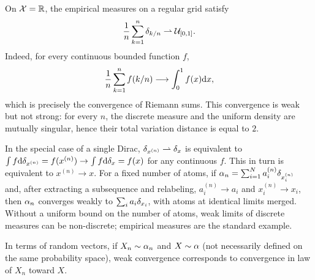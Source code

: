 \begin{rem}\label{rem-riemann-weak-limit}
	On $\mathcal{X}=\mathbb{R}$, the empirical measures on a regular grid satisfy
	\[
		\frac{1}{n} \sum_{k=1}^n \delta_{k/n} \rightharpoonup \mathcal{U}_{[0,1]}.
	\]
	Indeed, for every continuous bounded function $f$,
	\[
		\frac{1}{n} \sum_{k=1}^n f(k/n) \longrightarrow \int_0^1 f(x) \mathrm{d} x,
	\]
	which is precisely the convergence of Riemann sums. This convergence is weak but not strong: for every $n$, the discrete measure and the uniform density are mutually singular, hence their total variation distance is equal to $2$.
\end{rem}

\begin{rem}\label{rem-weak-conv-disc}
	In the special case of a single Dirac, $\delta_{x^{(n)}} \rightharpoonup \delta_x$ is equivalent to $\int f \mathrm{d}\delta_{x^{(n)}} = f(x^{(n)}) \rightarrow \int f \mathrm{d}\delta_{x} = f(x)$ for any continuous $f$. This in turn is equivalent to $x^{(n)} \rightarrow x$.
	For a fixed number of atoms, if $\alpha_n=\sum_{i=1}^N a_i^{(n)}\delta_{x_i^{(n)}}$ and, after extracting a subsequence and relabeling, $a_i^{(n)}\to a_i$ and $x_i^{(n)}\to x_i$, then $\alpha_n$ converges weakly to $\sum_i a_i\delta_{x_i}$, with atoms at identical limits merged. Without a uniform bound on the number of atoms, weak limits of discrete measures can be non-discrete; empirical measures are the standard example.
\end{rem}

In terms of random vectors, if $X_n \sim \alpha_n$ and $X \sim \alpha$ (not necessarily defined on the same probability space), weak convergence corresponds to convergence in law of $X_n$ toward $X$.

